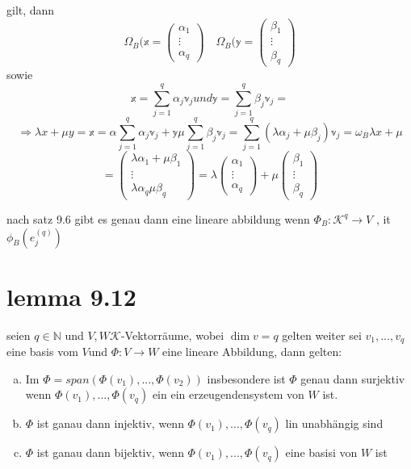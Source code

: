 \documentclass[11pt]{article}
\begin{document}
\begin{itemize}
  gilt, dann 
  \[\Omega_B(\mathbb{x}=
  \begin{pmatrix}
  \alpha_1\\ \vdots\\ \alpha_q
 \end{pmatrix}
 \quad
 \Omega_B(\mathbb{y}=
  \begin{pmatrix}
  \beta_1\\ \vdots\\ \beta_q
 \end{pmatrix}\]
 sowie \[\mathbb{x}=\sum_{j=1}^{q}\alpha_j \mathbb{v}_j und \mathbb{y}=\sum_{j=1}^{q}\beta_j \mathbb{v}_j=\] 
 \[
 \Rightarrow \lambda x + \mu y= \mathbb{x}=\alpha \sum_{j=1}^{q}\alpha_j \mathbb{v}_j + \mathbb{y}\mu\sum_{j=1}^{q}\beta_j \mathbb{v}_j
 = \sum_{j=1}^{q}(\lambda\alpha_j+\mu\beta_j )\mathbb{v}_j= \omega_B \lambda x+\mu\]
 \[=
 \begin{pmatrix}
  \lambda\alpha_1+\mu \beta_1\\ \vdots\\ \lambda\alpha_q\mu\beta_q
 \end{pmatrix}
 =\lambda\begin{pmatrix}
  \alpha_1\\ \vdots\\ \alpha_q
 \end{pmatrix}
 +\mu\begin{pmatrix}
  \beta_1\\ \vdots\\ \beta_q
 \end{pmatrix}
 \]
\end{itemize}
nach satz 9.6 gibt es genau dann eine lineare abbildung wenn $\Phi _B : \mathcal{K}^q\rightarrow V$ , it 
$\phi_B(e_j^(q))$


\section{lemma 9.12}
seien $q \in \mathbb{N}$ und $V,W \mathcal{K}$-Vektorräume, wobei $\dim v=q$ gelten weiter sei $v_1,...,v_q$ eine basis vom $V $und $\Phi: V\rightarrow W$ eine lineare Abbildung, dann gelten:
\begin{enumerate}[a)]
 \item Im $\Phi = span (\Phi(v_1),...,\Phi(v_2))$ insbesondere ist $\Phi$ genau dann surjektiv wenn $\Phi(v_1) ,..., \Phi(v_q)$ ein ein erzeugendensystem von $W$ ist.
 \item $\Phi$ ist ganau dann injektiv, wenn $\Phi(v_1),..., \Phi(v_q)$ lin unabhängig sind
 \item $\Phi$ ist ganau dann bijektiv, wenn $\Phi(v_1),..., \Phi(v_q)$ eine basisi von $W$ ist
\end{enumerate}
\end{document}
